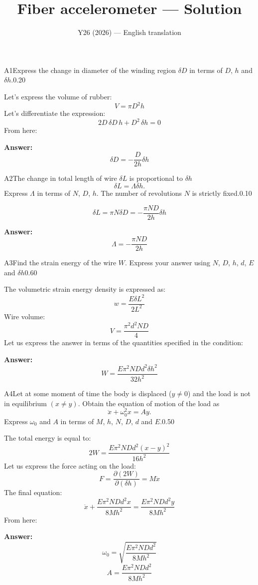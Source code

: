 \documentclass[11pt,a4paper]{article}
\title{\textbf{Fiber accelerometer --- Solution}}
\author{\normalsize Y26 (2026) — English translation}
\date{}
\begin{document}
\maketitle\vspace{-0.5em}
\begin{solcard}{A1}{Express the change in diameter of the winding region $\delta D$ in terms of $D$, $h$ and $\delta h$.}{0.20}

Let's express the volume of rubber: \[V=\pi D^2 h\]Let's differentiate the expression: \[2D \, \delta D \,h+D^2 \, \delta h=0\]From here:

\par\smallskip\noindent\textbf{Answer:} \[\delta D=-\dfrac{D}{2h}\delta h\]
\end{solcard}

\begin{solcard}{A2}{The change in total length of wire $\delta L$ is proportional to $\delta h$ \[\delta L = \Lambda \delta h.\] Express $\Lambda$ in terms of $N$, $D$, $h$. The number of revolutions $N$ is strictly fixed.}{0.10}

\[\delta L=\pi N\delta D=-\dfrac{\pi N D}{2h}\delta h\]

\par\smallskip\noindent\textbf{Answer:} \[\Lambda=-\dfrac{\pi N D}{2h}\]
\end{solcard}

\begin{solcard}{A3}{Find the strain energy of the wire $W$. Express your answer using $N$, $D$, $h$, $d$, $E$ and $\delta h$}{0.60}

The volumetric strain energy density is expressed as: \[w=\dfrac{E\delta L^2}{2 L^2}\]Wire volume: \[V=\dfrac{\pi^2 d^2 ND}{4}\]Let us express the answer in terms of the quantities specified in the condition:

\par\smallskip\noindent\textbf{Answer:} \[W=\dfrac{E\pi^2 ND d^2\delta h^2}{32h^2}\]
\end{solcard}

\begin{solcard}{A4}{Let at some moment of time the body is displaced ($y \neq 0$) and the load is not in equilibrium $(x \neq y)$. Obtain the equation of motion of the load as \[\ddot{x} + \omega_0^2 x = A y.\] Express $\omega_0$ and $A$ in terms of $M$, $h$, $N$, $D$, $d$ and $E$.}{0.50}

The total energy is equal to: \[2W=\dfrac{E\pi^2 ND d^2(x-y)^2}{16h^2}\]Let us express the force acting on the load: \[F=\dfrac{\partial (2W)}{\partial(\delta h)}=M\ddot x\]The final equation: \[\ddot x+\dfrac{E\pi^2 ND d^2 x}{8Mh^2}=\dfrac{E\pi^2 ND d^2 y}{8Mh^2}\]From here:

\par\smallskip\noindent\textbf{Answer:} \[\omega_0=\sqrt{\dfrac{E\pi^2 ND d^2 }{8Mh^2}}\]\[A={\dfrac{E\pi^2 ND d^2 }{8Mh^2}}\]
\end{solcard}
\end{document}
